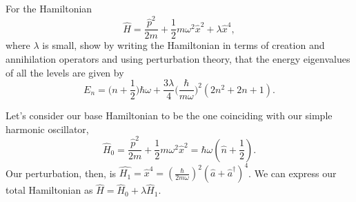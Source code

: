 \documentclass[../qft-for-the-gifted-amateur.tex]{subfiles}
\begin{document}
\begin{questions}
	\question For the Hamiltonian
	\[
		\hat{H}=\frac{\hat{p}^2}{2m}+\frac{1}{2}m\omega^2\hat{x}^2 + \lambda\hat{x}^4,
	\]
	where $\lambda$ is small, show by writing the Hamiltonian in terms of creation and annihilation operators and using perturbation theory, that the energy eigenvalues of all the levels are given by 
	\[
		E_n = \Big(n+\frac{1}{2}\Big)\hbar\omega + \frac{3\lambda}{4}\Big(\frac{\hbar}{m\omega}\Big)^2(2n^2+2n+1).
	\]
	
	\begin{solution}
		Let's consider our base Hamiltonian to be the one coinciding with our
		simple harmonic oscillator,
		\[{\hat{H}}_{0} = \frac{{\hat{p}}^{2}}{2m} + \frac{1}{2}m\omega^{2}{\hat{x}}^{2} = \hbar\omega(\hat{n} + \frac{1}{2}).
		\]
		Our perturbation, then, is
		$\hat{H_{1}} = {\hat{x}}^{4} = (\frac{\hbar}{2m\omega})^{2}(\hat{a} + {\hat{a}}^{\dagger})^{4}$.
		We can express our total Hamiltonian as $\hat{H} = {\hat{H}}_{0} + \lambda{\hat{H}}_{1}$.
		

\end{solution}
\end{questions}
\end{document}
